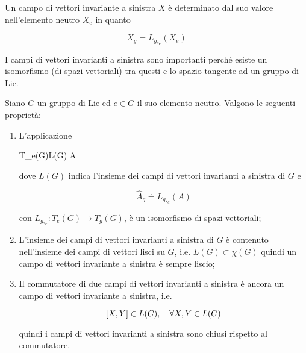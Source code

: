\begin{remark}
	Un campo di vettori invariante a sinistra $ X $ è determinato dal suo valore nell'elemento neutro $ X_{e} $ in quanto
	
	\begin{equation}
		X_{g} = L_{g_{*e}} (X_{e})
	\end{equation}
\end{remark}

I campi di vettori invarianti a sinistra sono importanti perché esiste un isomorfismo (di spazi vettoriali) tra questi e lo spazio tangente ad un gruppo di Lie.

\begin{theorem}
	Siano $ G $ un gruppo di Lie ed $ e \in G $ il suo elemento neutro. Valgono le seguenti proprietà:
	
	\begin{enumerate}
		\item L'applicazione
		
		\map{\hat{}}%
			{T_{e}(G)}{L(G)}%
			{A}{}
			
		dove $ L(G) $ indica l'insieme dei campi di vettori invarianti a sinistra di $ G $ e
		
		\begin{equation}
			\hat{A}_{g} \doteq L_{g_{*e}}(A)
		\end{equation}
	
		con $ L_{g_{*e}} : T_{e}(G) \to T_{g}(G) $, è un isomorfismo di spazi vettoriali;
		
		\item L'insieme dei campi di vettori invarianti a sinistra di $ G $ è contenuto nell'insieme dei campi di vettori lisci su $ G $, i.e. $ L(G) \subset \chi(G) $ quindi un campo di vettori invariante a sinistra è sempre liscio;
		
		\item Il commutatore di due campi di vettori invarianti a sinistra è ancora un campo di vettori invariante a sinistra, i.e.
		
		\begin{equation}
			\comm{X}{Y} \in L(G) \qcomma \forall X,Y \in L(G)
		\end{equation}
	
		quindi i campi di vettori invarianti a sinistra sono chiusi rispetto al commutatore.
	\end{enumerate}
\end{theorem}

